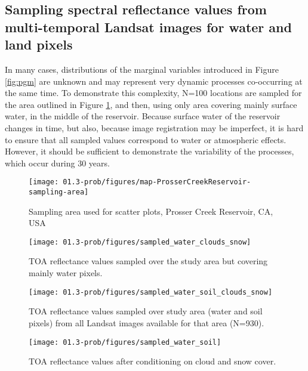 \subsection{Sampling spectral reflectance values from multi-temporal Landsat images for water and land pixels}

In many cases, distributions of the marginal variables introduced in Figure \ref{fig:pgm} are unknown and may represent very dynamic processes co-occurring at the same time. To demonstrate this complexity, N=100 locations are sampled for the area outlined in Figure \ref{fig:study-area-PC}, and then, using only area covering mainly surface water, in the middle of the reservoir. Because surface water of the reservoir changes in time, but also, because image registration may be imperfect, it is hard to ensure that all sampled values correspond to water or atmospheric effects. However, it should be sufficient to demonstrate the variability of the processes, which occur during 30 years.

\begin{figure}[H]
	\centering
	\texttt{[image: 01.3-prob/figures/map-ProsserCreekReservoir-sampling-area]}
	\caption{Sampling area used for scatter plots, Prosser Creek Reservoir, CA, USA}
	\label{fig:study-area-PC}
\end{figure}

\begin{figure}[H]
	\texttt{[image: 01.3-prob/figures/sampled\_water\_clouds\_snow]}
	\caption{TOA reflectance values sampled over the study area but covering mainly water pixels.}
	\label{fig:prob-sampled-water-cloud-snow}
\end{figure}

\begin{figure}[H]
	\texttt{[image: 01.3-prob/figures/sampled\_water\_soil\_clouds\_snow]}
	\caption{TOA reflectance values sampled over study area (water and soil pixels) from all Landsat images available for that area (N=930).}
	\label{fig:prob-sampled-water-soil-cloud-snow}
\end{figure}

\begin{figure}[H]
	\texttt{[image: 01.3-prob/figures/sampled\_water\_soil]}
	\caption{TOA reflectance values after conditioning on cloud and snow cover.}
	\label{fig:prob-sampled-water-soil}
\end{figure}


